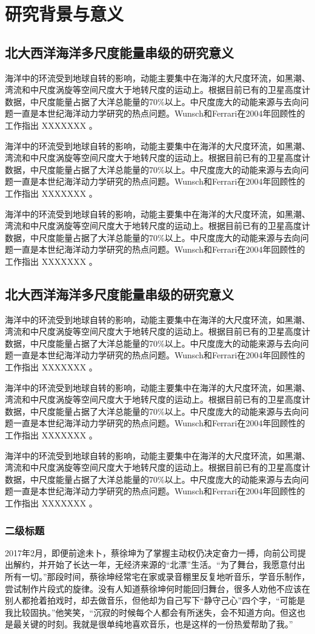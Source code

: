 

\chapter{研究背景与意义}
\section{北大西洋海洋多尺度能量串级的研究意义}

海洋中的环流受到地球自转的影响，动能主要集中在海洋的大尺度环流，如黑潮、湾流和中尺度涡旋等空间尺度大于地转尺度的运动上。根据目前已有的卫星高度计数据，中尺度能量占据了大洋总能量的70\%以上。中尺度庞大的动能来源与去向问题一直是本世纪海洋动力学研究的热点问题。Wunsch和Ferrari在2004年回顾性的工作指出 XXXXXXX 。

海洋中的环流受到地球自转的影响，动能主要集中在海洋的大尺度环流，如黑潮、湾流和中尺度涡旋等空间尺度大于地转尺度的运动上。根据目前已有的卫星高度计数据，中尺度能量占据了大洋总能量的70\%以上。中尺度庞大的动能来源与去向问题一直是本世纪海洋动力学研究的热点问题。Wunsch和Ferrari在2004年回顾性的工作指出 XXXXXXX 。

海洋中的环流受到地球自转的影响，动能主要集中在海洋的大尺度环流，如黑潮、湾流和中尺度涡旋等空间尺度大于地转尺度的运动上。根据目前已有的卫星高度计数据，中尺度能量占据了大洋总能量的70\%以上。中尺度庞大的动能来源与去向问题一直是本世纪海洋动力学研究的热点问题。Wunsch和Ferrari在2004年回顾性的工作指出 XXXXXXX 。

\section{北大西洋海洋多尺度能量串级的研究意义}

海洋中的环流受到地球自转的影响，动能主要集中在海洋的大尺度环流，如黑潮、湾流和中尺度涡旋等空间尺度大于地转尺度的运动上。根据目前已有的卫星高度计数据，中尺度能量占据了大洋总能量的70\%以上。中尺度庞大的动能来源与去向问题一直是本世纪海洋动力学研究的热点问题。Wunsch和Ferrari在2004年回顾性的工作指出 XXXXXXX 。

海洋中的环流受到地球自转的影响，动能主要集中在海洋的大尺度环流，如黑潮、湾流和中尺度涡旋等空间尺度大于地转尺度的运动上。根据目前已有的卫星高度计数据，中尺度能量占据了大洋总能量的70\%以上。中尺度庞大的动能来源与去向问题一直是本世纪海洋动力学研究的热点问题。Wunsch和Ferrari在2004年回顾性的工作指出 XXXXXXX 。

海洋中的环流受到地球自转的影响，动能主要集中在海洋的大尺度环流，如黑潮、湾流和中尺度涡旋等空间尺度大于地转尺度的运动上。根据目前已有的卫星高度计数据，中尺度能量占据了大洋总能量的70\%以上。中尺度庞大的动能来源与去向问题一直是本世纪海洋动力学研究的热点问题。Wunsch和Ferrari在2004年回顾性的工作指出 XXXXXXX 。

\subsection{二级标题}

2017年2月，即便前途未卜，蔡徐坤为了掌握主动权仍决定奋力一搏，向前公司提出解约，并开始了长达一年，无经济来源的“北漂”生活。“为了舞台，我愿意付出所有一切。”那段时间，蔡徐坤经常宅在家或录音棚里反复地听音乐，学音乐制作，尝试制作片段式的旋律。没有人知道蔡徐坤何时能回归舞台，很多人劝他不应该在别人都抢着拍戏时，却去做音乐，但他却为自己写下“静守己心”四个字，“可能是我比较固执。”他笑笑，“沉寂的时候每个人都会有所迷失，会不知道方向。但这也是最关键的时刻。我就是很单纯地喜欢音乐，也是这样的一份热爱帮助了我。”
